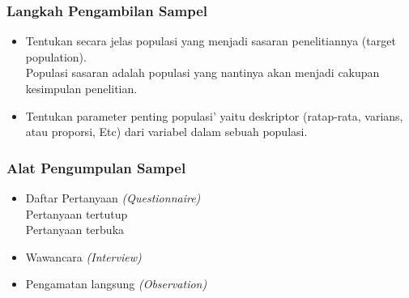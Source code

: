 \documentclass[main.tex]{subfiles}
\begin{document}
\begin{frame}[c]
	\frametitle{Langkah Pengambilan Sampel}
	\begin{itemize}
		\item Tentukan secara jelas populasi yang menjadi sasaran penelitiannya (target population).\hfill \\
		      Populasi sasaran adalah populasi yang nantinya akan menjadi cakupan kesimpulan penelitian.
		\item Tentukan parameter penting populasi’ yaitu deskriptor (ratap-rata, varians, atau proporsi, Etc) dari variabel  dalam sebuah populasi.
	\end{itemize}
\end{frame}

\begin{frame}[c]
	\frametitle{Alat Pengumpulan Sampel}
	\begin{itemize}
		\item Daftar Pertanyaan \textit{(Questionnaire)} \hfill \\
		      \tabitem Pertanyaan tertutup \\
		      \tabitem Pertanyaan terbuka
		\item Wawancara \textit{(Interview)}
		\item Pengamatan langsung \textit{(Observation)}
	\end{itemize}
\end{frame}
\end{document}
